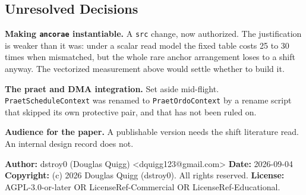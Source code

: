 \subsection{Unresolved Decisions}

\textbf{Making \texttt{ancorae} instantiable.} A \texttt{src} change, now authorized. The justification is weaker than it was: under a scalar read model the fixed table costs 25 to 30 times when mismatched, but the whole rare anchor arrangement loses to a shift anyway. The vectorized measurement above would settle whether to build it.

\textbf{The praet and DMA integration.} Set aside mid-flight. \texttt{Praet\allowbreak{}Schedule\allowbreak{}Context} was renamed to \texttt{Praet\allowbreak{}Ordo\allowbreak{}Context} by a rename script that skipped its own protective pair, and that has not been ruled on.

\textbf{Audience for the paper.} A publishable version needs the shift literature read. An internal design record does not.

\medskip

\textbf{Author:} dstroy0 (Douglas Quigg) <dquigg123@gmail.com> \textbf{Date:} 2026-09-04 \textbf{Copyright:} (c) 2026 Douglas Quigg (dstroy0). All rights reserved. \textbf{License:} AGPL-3.0-or-later OR LicenseRef-Commercial OR LicenseRef-Educational.


